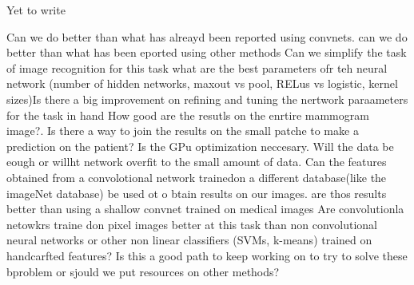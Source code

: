 Yet to write

Can we do better than what has alreayd been reported using convnets. can we do better than what has been eported using other methods
Can we simplify the task of image recognition for this task
what are the best parameters ofr teh neural network (number of hidden networks, maxout vs pool, RELus vs logistic, kernel sizes)Is there a big improvement on refining and tuning the nertwork paraameters for the task in hand
How good are the resutls on the enrtire mammogram image?. Is there a way to join the results on the small patche to make a prediction on the patient?
Is the GPu optimization neccesary. 
Will the data be eough or willht network overfit to the small amount of data.
Can the features obtained from a convolotional network trainedon  a different database(like the imageNet database) be used ot o btain results on our images. are thos results better than using a shallow convnet trained on medical images
Are convolutionla netowkrs traine don pixel images better at this task than non convolutional neural networks or other non linear classifiers (SVMs, k-means) trained on handcarfted features?
Is this a good path to keep working on to try to solve these bproblem or sjould we put resources on other methods?

\begin{comment}
Las {\it Hipótesis}, que de acuerdo a Sampieri {\it indican lo que estamos
  buscando 
o tratando de probar y pueden definirse como explicaciones tentativas del
fenómeno investigado y formuladas a manera de proposiciones}. Las hipótesis
surgen normalmente de los {\it Objetivos} y proponen contestar tentativamente
  las preguntas de investigación.

{\bf Las preguntas de investigación se incluyen aquí ......}
\end{comment}
